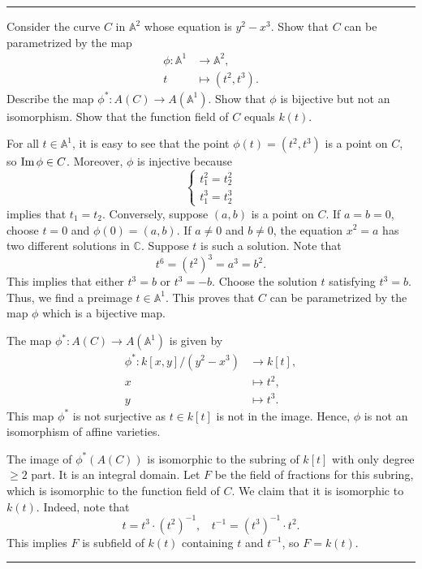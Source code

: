 \documentclass[letterpaper, 12pt]{article}
\begin{document}
\noindent\rule{7in}{2.8pt}
\begin{problem}{3.19}
Consider the curve \(C\) in \(\mathbb{A}^2\) whose equation is \(y^2-x^3\). Show that \(C\) can be parametrized by the map
\begin{align*}
     \phi:\mathbb{A}^1&\rightarrow \mathbb{A}^2,\\ 
         t&\mapsto (t^2,t^3).
\end{align*}
Describe the map \(\phi^*:A(C)\rightarrow A(\mathbb{A}^1)\). Show that \(\phi\) is bijective but not an isomorphism. Show that the function field of \(C\) equals \(k(t)\).
\end{problem}
\begin{solution}
For all \(t\in \mathbb{A}^1\), it is easy to see that the point \(\phi(t)=(t^2,t^3)\) is a point on \(C\), so \(\text{Im}\, \phi\in C\). Moreover, \(\phi\) is injective because 
\[\begin{cases}
  t_1^2=t_2^2\\[0.3em]
  t_1^3=t_2^3
\end{cases}\]
implies that \(t_1=t_2\). Conversely, suppose \((a,b)\) is a point on \(C\). If \(a=b=0\), choose \(t=0\) and \(\phi(0)=(a,b)\). If \(a\neq 0\) and \(b\neq 0\), the equation \(x^2=a\) has two different solutions in \(\mathbb{C}\). Suppose \(t\) is such a solution. Note that 
\[t^6=(t^2)^3=a^3=b^2.\]
This implies that either \(t^3=b\) or \(t^3=-b\). Choose the solution \(t\) satisfying \(t^3=b\). Thus, we find a preimage \(t\in \mathbb{A}^1\). This proves that \(C\) can be parametrized by the map \(\phi\) which is a bijective map. 

The map \(\phi^*:A(C)\rightarrow A(\mathbb{A}^1)\) is given by
\begin{align}
  \phi^*:k[x,y]/(y^2-x^3)&\rightarrow k[t],\\
         x&\mapsto t^2,\\
         y&\mapsto t^3. 
\end{align}
This map \(\phi^*\) is not surjective as \(t\in k[t]\) is not in the image. Hence, \(\phi\) is not an isomorphism of affine varieties. 

The image of \(\phi^*(A(C))\) is isomorphic to the subring of \(k[t]\) with only degree \(\geq 2\) part. It is an integral domain. Let \(F\) be the field of fractions for this subring, which is isomorphic to the function field of \(C\). We claim that it is isomorphic to \(k(t)\). Indeed, note that 
\[t=t^3\cdot (t^2)^{-1},\ \ \ \ t^{-1}=(t^3)^{-1}\cdot t^2.\]
This implies \(F\) is subfield of \(k(t)\) containing \(t\) and \(t^{-1}\), so \(F=k(t)\).
\end{solution}

\noindent\rule{7in}{2.8pt}
\end{document}
